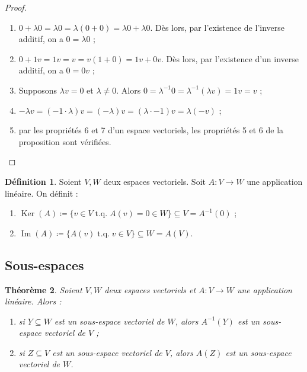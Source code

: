 \documentclass{article}
\DeclareMathOperator{\tq}{\text{ t.q. }}
\DeclareMathOperator{\Ker}{Ker}
\DeclareMathOperator{\Imf}{Im}
\newtheorem{thm}{Théorème}[section]
\theoremstyle{definition}
\newtheorem{déf}[thm]{Définition}
\theoremstyle{remark}
\begin{document}
		\begin{proof}~
			\begin{enumerate}
				\item $0 + \lambda0 = \lambda0 = \lambda(0+0) = \lambda0 + \lambda0$. Dès lors, par l'existence de l'inverse additif, on a $0 = \lambda 0$ ;
				\item $0 + 1v = 1v = v = v(1+0) = 1v + 0v$. Dès lors, par l'existence d'un inverse additif, on a $0 = 0v$ ;
				\item Supposons $\lambda v = 0$ et $\lambda \neq 0$. Alors $0 = \lambda^{-1}0 = \lambda^{-1}(\lambda v) = 1v = v$ ;
				\item $-\lambda v = (-1 \cdot \lambda)v = (-\lambda)v = (\lambda \cdot -1)v = \lambda(-v)$ ;
				\item par les propriétés 6 et 7 d'un espace vectoriels, les propriétés 5 et 6 de la proposition sont vérifiées.
			\end{enumerate}
		\end{proof}

		\begin{déf} Soient $V, W$ deux espaces vectoriels. Soit $A : V \to W$ une application linéaire. On définit :
		\begin{enumerate}
			\item $\Ker(A) \coloneqq \{v \in V \tq A(v) = 0 \in W\} \subseteq V = A^{-1}(0)$ ;
			\item $\Imf(A) \coloneqq \{A(v) \tq v \in V\} \subseteq W = A(V)$.
		\end{enumerate}
		\end{déf}

	\subsection{Sous-espaces}
		\begin{thm}\label{sousEspacesApplicationLinéaire} Soient $V, W$ deux espaces vectoriels et $A : V \to W$ une application linéaire. Alors :
		\begin{enumerate}
			\item si $Y \subseteq W$ est un sous-espace vectoriel de $W$, alors $A^{-1}(Y)$ est un sous-espace vectoriel de $V$ ;
			\item si $Z \subseteq V$ est un sous-espace vectoriel de $V$, alors $A(Z)$ est un sous-espace vectoriel de $W$.
		\end{enumerate}
		\end{thm}
\end{document}
